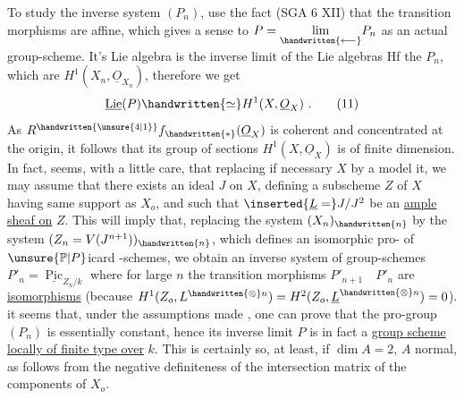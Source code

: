 To study the inverse system $(P_n)$, use the fact (SGA 6 XII) that the transition morphisms are affine, which gives a sense to $P=\underset{\handwritten{\longleftarrow}}{\lim}P_n$ as an actual group-scheme. It's Lie algebra is the inverse limit of the Lie algebras Hf the $P_n$, which are $H^1(X_n,\underline{O}_{X_n})$, therefore we get
\[
\underline{\operatorname{Lie}}(P)\handwritten{\simeq}H^1(X,\underline{O}_X)\ .
\tag*{(11)}
\]
As $R^{\handwritten{\unsure{4|1}}}f_{\handwritten{*}}(\underline{O}_X)$\unsure{;} is coherent and concentrated at the origin, it follows that its group of sections $H^1(X,\underline{O}_X)$ is of finite dimension. In fact,  seems, with a little care, that  replacing if necessary $X$ by a  model  it, we may assume that there exists an  ideal $J$ on $X$,  defining a subscheme $Z$ of $X$ having same support as $X_o$, and such that $\inserted{\underline{L}=}J/J^2$ be an \uline{ample sheaf on} $Z$. This will imply that, replacing the system $(X_n)_{\handwritten{n}}$ by the system $(Z_n=V(J^{n+1}))_{\handwritten{n}}$, which defines   an isomorphic pro- of $\unsure{\mathbb{P}|P}$icard -schemes, we obtain an inverse system of group-schemes $P'_n=\underline{\operatorname{Pic}}_{Z_n/k}$ where for large $n$ the transition morphisms  $P'_{n+1}\quad P'_n$ are \uline{isomorphisms} (because $H^1(Z_o,L^{\handwritten{\otimes}n})=H^2(Z_o,\underline{L}^{\handwritten{\otimes}n})=0$).  it seems that, under the assumptions made , one can prove that the pro-group $(P_n)$ is essentially constant, hence its inverse limit $P$ is in fact a \uline{group scheme locally of finite type over} $k$. This is certainly so, at least, if $\dim A=2$, $A$ normal, as follows from the negative definiteness of the intersection matrix of the components of $X_o$.


